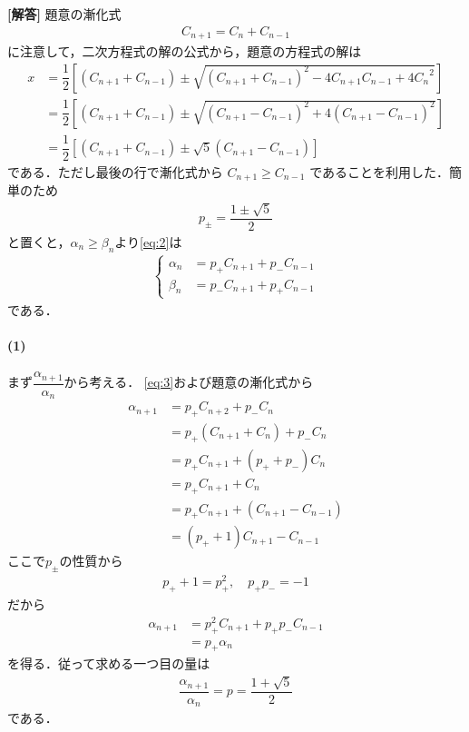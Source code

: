 \documentclass[../../main.tex]{subfiles}
\begin{document}
\begin{oframed}
  
\end{oframed}

{\bf [解答]}
題意の漸化式
\begin{align}
  C_{n+1} = C_{n} + C_{n-1} \label{eq:1}
\end{align}
に注意して，二次方程式の解の公式から，題意の方程式の解は
\begin{align}
  x &= \dfrac{1}{2}\left[ (C_{n+1}+C_{n-1}) \pm \sqrt{(C_{n+1}+C_{n-1})^2 - 4C_{n+1}C_{n-1} + 4{C_n}^2} \right] \\
  &= \dfrac{1}{2}\left[ (C_{n+1}+C_{n-1}) \pm \sqrt{(C_{n+1}-C_{n-1})^2 + 4(C_{n+1}-C_{n-1})^2} \right] \\
  &= \dfrac{1}{2}\left[ (C_{n+1}+C_{n-1}) \pm \sqrt{5}(C_{n+1}-C_{n-1}) \right] \label{eq:2}
\end{align}
である．ただし最後の行で漸化式から $C_{n+1} \ge C_{n-1}$ であることを利用した．簡単のため
\begin{align}
  p_{\pm} = \dfrac{1\pm\sqrt{5}}{2}
\end{align}
と置くと，$\alpha_n \ge \beta_n$より\cref{eq:2}は
\begin{align}
  \begin{cases}
    \alpha_n &= p_{+} C_{n+1} + p_{-} C_{n-1} \\
    \beta_n  &= p_{-} C_{n+1} + p_{+} C_{n-1}
  \end{cases} \label{eq:3}
\end{align}
である．

\paragraph{(1)}
まず$\dfrac{\alpha_{n+1}}{\alpha_n}$から考える．
\cref{eq:3}および題意の漸化式から
\begin{align}
  \alpha_{n+1}
  &= p_{+} C_{n+2} + p_{-} C_{n} \\
  &= p_{+} \left(C_{n+1}+C_{n}\right) + p_{-} C_{n} \\
  &= p_{+} C_{n+1} + \left(p_{+}+p_{-}\right) C_{n} \\
  &= p_{+} C_{n+1} + C_{n} \\
  &= p_{+} C_{n+1} + \left(C_{n+1}-C_{n-1}\right) \\
  &= \left(p_{+}+1\right) C_{n+1} - C_{n-1}
\end{align}
ここで$p_{\pm}$の性質から
\begin{align}
  p_{+}+1 = p_{+}^2, \quad p_{+}p_{-} = -1
\end{align}
だから
\begin{align}
  \alpha_{n+1}
  &= p_{+}^2 C_{n+1} + p_{+}p_{-} C_{n-1} \\
  &= p_{+}\alpha_{n}
\end{align}
を得る．従って求める一つ目の量は
\begin{align}
  \dfrac{\alpha_{n+1}}{\alpha_n} = p = \dfrac{1+\sqrt{5}}{2}
\end{align}
である．
\end{document}
